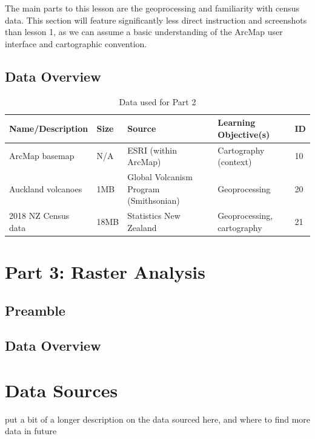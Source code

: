 \documentclass{article}
\begin{document}
The main parts to this lesson are the geoprocessing and familiarity with census data. This section will feature significantly less direct instruction and screenshots than lesson 1, as we can assume a basic understanding of the ArcMap user interface and cartographic convention.

\subsection{Data Overview}

\begin{table}[h]
\begin{center}
    \begin{tabular}{ | m{4cm} | m{1cm}| m{3.5cm} | m{5cm} | m{1cm} | } 
    \hline
    \cellcolor{red!35!blue!33!green!33!}\textbf{Name/Description} & 
    \cellcolor{red!35!blue!33!green!33!}\textbf{Size} &
    \cellcolor{red!35!blue!33!green!33!}\textbf{Source} &
    \cellcolor{red!35!blue!33!green!33!}\textbf{Learning Objective(s)} &
    \cellcolor{red!35!blue!33!green!33!}\textbf{ID} \\
    \hline
    ArcMap basemap & N/A & ESRI (within ArcMap) & Cartography (context) & 10 \\
    \hline
    Auckland volcanoes & 1MB & Global Volcanism Program (Smithsonian) & Geoprocessing & 20 \\
    \hline
    2018 NZ Census data & 18MB & Statistics New Zealand & Geoprocessing, cartography & 21 \\
    \hline
    \end{tabular}
\end{center}
\caption{\label{tb_data_2}Data used for Part 2}
\end{table}

\pagebreak
\section{Part 3: Raster Analysis}
\subsection{Preamble}
\subsection{Data Overview}

\section{Data Sources}
put a bit of a longer description on the data sourced here, and where to find more data in future
\end{document}
